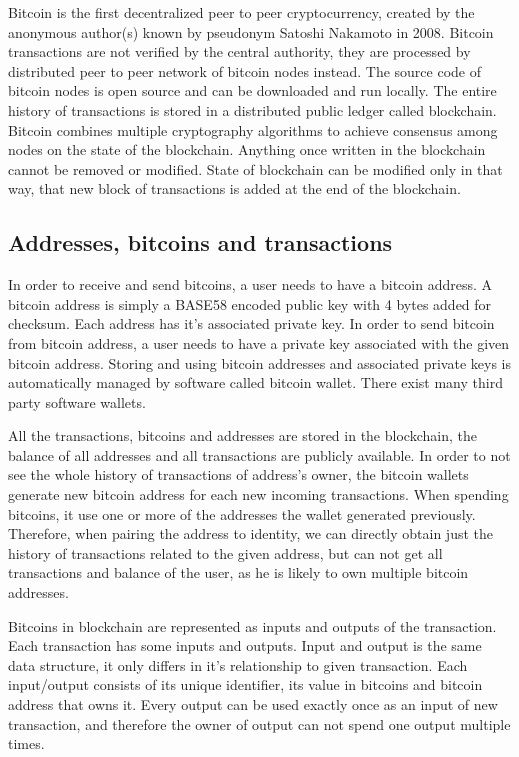 \documentclass[
  digital, %
  table,   %
  lof,     %
  lot,     %
  oneside
]{fithesis3}
\begin{document}
Bitcoin \parencite{nakamoto2008bitcoin} is the first decentralized peer to peer cryptocurrency,
created by the anonymous author(s) known by pseudonym Satoshi Nakamoto in 2008.
Bitcoin transactions are not verified by the central authority, they are processed by distributed peer to peer network of bitcoin nodes instead. 
The source code of bitcoin nodes is open source and can be downloaded and run locally. 
The entire history of transactions is stored in a distributed public ledger called blockchain.
Bitcoin combines multiple cryptography algorithms to achieve consensus among nodes
on the state of the blockchain. Anything once written in the blockchain
cannot be removed or modified. State of blockchain can be modified only in that way, that new
block of transactions is added at the end of the blockchain.

\subsection{Addresses, bitcoins and transactions}
In order to receive and send bitcoins, a user needs to have a bitcoin address.
A bitcoin address is simply a BASE58 encoded public key with 4 bytes added for checksum.
Each address has it's associated private key.
In order to send bitcoin from bitcoin address, a user needs to have a private key associated with the given bitcoin address.
Storing and using bitcoin addresses and associated private keys is automatically managed
by software called bitcoin wallet. There exist many third party software wallets.

All the transactions, bitcoins and addresses are stored in the blockchain,
the balance of all addresses and all transactions are publicly available.
In order to not see the whole history of transactions of address's owner,
the bitcoin wallets generate new bitcoin address for each new incoming transactions. When spending bitcoins, it use one or more of the addresses the wallet generated previously.
Therefore, when pairing the address to identity, we can directly obtain just the history of transactions related to the given
address, but can not get all transactions and balance of the user, as he is likely to own multiple bitcoin addresses.

Bitcoins in blockchain are represented as inputs and outputs of the transaction.
Each transaction has some inputs and outputs. 
Input and output is the same data structure, it only differs in it's relationship to given transaction.
Each input/output consists of its unique identifier, its value in bitcoins and bitcoin address that owns it.
Every output can be used exactly once as an input of new transaction, and therefore the owner of output can not
spend one output multiple times.
\end{document}
